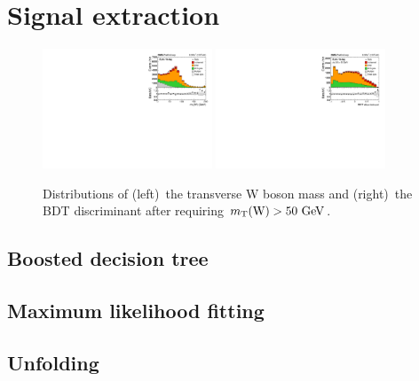 \documentclass[12pt]{article}
\begin{document}
\section{Signal extraction}

\begin{figure}[th]
\begin{center}
\includegraphics[width=0.45\textwidth]{figures/fit/reco_mtw.pdf}\hspace{0.05\textwidth}
\includegraphics[width=0.45\textwidth]{figures/fit/reco_BDT.pdf}
\end{center}

\caption{Distributions of (left)~the transverse W boson mass and (right)~the BDT discriminant after requiring $m_{\mathrm{T}}(\mathrm{W})>50~\mathrm{GeV}$.}
\end{figure}

\subsection{Boosted decision tree}

\subsection{Maximum likelihood fitting}

\subsection{Unfolding}
\end{document}
